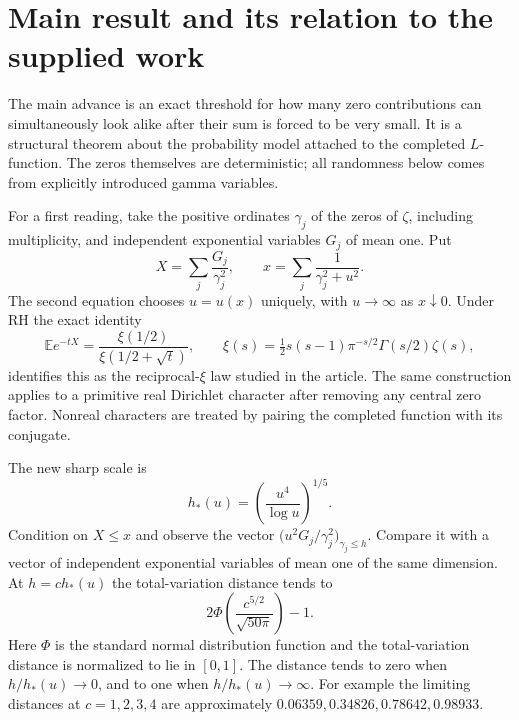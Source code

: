 \section{Main result and its relation to the supplied work}
\label{sec:overview}

The main advance is an exact threshold for how many zero contributions
can simultaneously look alike after their sum is forced to be very small.
It is a structural theorem about the probability model attached to the
completed $L$-function. The zeros themselves are deterministic; all
randomness below comes from explicitly introduced gamma variables.

For a first reading, take the positive ordinates $\gamma_j$ of the zeros
of $\zeta$, including multiplicity, and independent exponential variables
$G_j$ of mean one. Put
\[
 X=\sum_j\frac{G_j}{\gamma_j^2},\qquad
 x=\sum_j\frac1{\gamma_j^2+u^2}.
\]
The second equation chooses $u=u(x)$ uniquely, with $u\to\infty$ as
$x\downarrow0$. Under RH the exact identity
\begin{equation}\label{eq:overview-transform}
 \mathbb E e^{-tX}
 =\frac{\xi(1/2)}{\xi(1/2+\sqrt t)},\qquad
 \xi(s)=\tfrac12s(s-1)\pi^{-s/2}\Gamma(s/2)\zeta(s),
\end{equation}
identifies this as the reciprocal-$\xi$ law studied in the article.
The same construction applies to a primitive real Dirichlet character
after removing any central zero factor. Nonreal characters are treated
by pairing the completed function with its conjugate.

The new sharp scale is
\begin{equation}\label{eq:overview-height}
 h_*(u)=\left(\frac{u^4}{\log u}\right)^{1/5}.
\end{equation}
Condition on $X\le x$ and observe the vector
$\bigl(u^2G_j/\gamma_j^2\bigr)_{\gamma_j\le h}$. Compare it with a
vector of independent exponential variables of mean one of the same
dimension. At $h=ch_*(u)$ the total-variation distance tends to
\begin{equation}\label{eq:overview-TV}
 \boxed{\quad 2\Phi\!\left(\frac{c^{5/2}}{\sqrt{50\pi}}\right)-1.\quad}
\end{equation}
Here $\Phi$ is the standard normal distribution function and the
total-variation distance is normalized to lie in $[0,1]$. The distance
tends to zero when $h/h_*(u)\to0$, and to one when $h/h_*(u)\to\infty$.
For example the limiting distances at $c=1,2,3,4$ are approximately
$0.06359,0.34826,0.78642,0.98933$.

